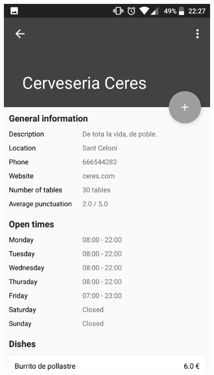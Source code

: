 \begin{figure}[!h]
\centering
\includegraphics[scale=0.15]{Figures/wisebite_screenshot_5.png}

\end{figure}
